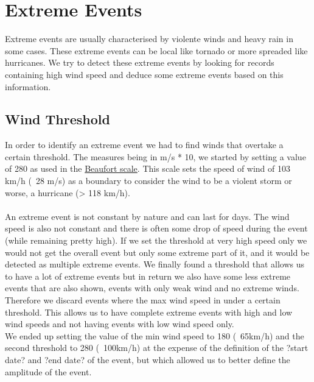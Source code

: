 \section{Extreme Events}
\noindent
Extreme events are usually characterised by violente winds and heavy rain in some cases. These extreme events can be local like tornado or more spreaded like hurricanes. We try to detect these extreme events by looking for records containing high wind speed and deduce some extreme events based on this information.

\subsection{Wind Threshold}
In order to identify an extreme event we had to find winds that overtake a certain threshold. The measures being in m/s * 10, we started by setting a value of 280 as used in the \href{http://en.wikipedia.org/wiki/Beaufort_scale}{Beaufort scale}. This scale sets the speed of wind of 103 km/h (~28 m/s) as a boundary to consider the wind to be a violent storm or worse, a hurricane (> 118 km/h).\\
\\
An extreme event is not constant by nature and can last for days. The wind speed is also not constant and there is often some drop of speed during the event (while remaining pretty high). If we set the threshold at very high speed only we would not get the overall event but only some extreme part of it, and it would be detected as multiple extreme events. We finally found a threshold that allows us to have a lot of extreme events but in return we also have some less extreme events that are also shown, events with only weak wind and no extreme winds. Therefore we discard events where the max wind speed in under a certain threshold. This allows us to have complete extreme events with high and low wind speeds and not having events with low wind speed only.\\
We ended up setting the value of the min wind speed to 180 (~65km/h) and the second threshold to 280 (~100km/h) at the expense of the definition of the ?start date? and ?end date? of the event, but which allowed us to better define the amplitude of the event.

